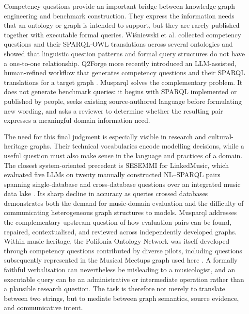 Competency questions provide an important bridge between knowledge-graph engineering and benchmark construction. They express the information needs that an ontology or graph is intended to support, but they are rarely published together with executable formal queries. Wiśniewski et al. \citep{wisniewski2019competency} collected competency questions and their SPARQL-OWL translations across several ontologies and showed that linguistic question patterns and formal query structures do not have a one-to-one relationship. Q2Forge more recently introduced an LLM-assisted, human-refined workflow that generates competency questions and their SPARQL translations for a target graph \citep{taghzouti2025q2forge}. Musparql solves the complementary problem. It does not generate benchmark queries: it begins with SPARQL implemented or published by people, seeks existing source-authored language before formulating new wording, and asks a reviewer to determine whether the resulting pair expresses a meaningful domain information need.

The need for this final judgment is especially visible in research and cultural-heritage graphs. Their technical vocabularies encode modelling decisions, while a useful question must also make sense in the language and practices of a domain. The closest system-oriented precedent is SESEMMI for LinkedMusic, which evaluated five LLMs on twenty manually constructed NL--SPARQL pairs spanning single-database and cross-database questions over an integrated music data lake \citep{pond2025sesemmi}. Its sharp decline in accuracy as queries crossed databases demonstrates both the demand for music-domain evaluation and the difficulty of communicating heterogeneous graph structures to models. Musparql addresses the complementary upstream question of how evaluation pairs can be found, repaired, contextualised, and reviewed across independently developed graphs. Within music heritage, the Polifonia Ontology Network was itself developed through competency questions contributed by diverse pilots, including questions subsequently represented in the Musical Meetups graph used here \citep{deberardinis2023polifonia}. A formally faithful verbalisation can nevertheless be misleading to a musicologist, and an executable query can be an administrative or intermediate operation rather than a plausible research question. The task is therefore not merely to translate between two strings, but to mediate between graph semantics, source evidence, and communicative intent.

